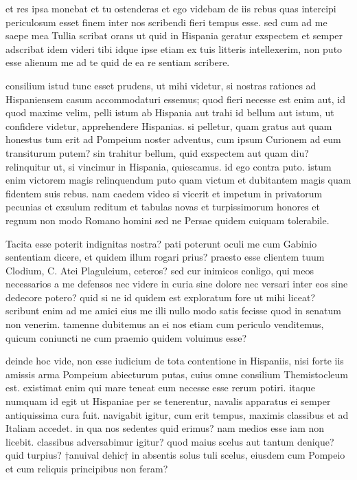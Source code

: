 


 et res ipsa monebat et tu ostenderas et ego videbam de iis rebus quas intercipi periculosum esset finem inter nos scribendi fieri tempus esse. sed cum ad me saepe mea Tullia scribat orans ut quid in Hispania geratur exspectem et semper adscribat idem videri tibi idque ipse etiam ex tuis litteris intellexerim, non puto esse alienum me ad te quid de ea re sentiam scribere.

 consilium istud tunc esset prudens, ut mihi videtur, si nostras rationes ad Hispaniensem casum accommodaturi essemus; quod fieri necesse est enim aut, id quod maxime velim, pelli istum ab Hispania aut trahi id bellum aut istum, ut confidere videtur, apprehendere Hispanias. si pelletur, quam gratus aut quam honestus tum erit ad Pompeium noster adventus, cum ipsum Curionem ad eum transiturum putem? sin trahitur bellum, quid exspectem aut quam diu? relinquitur ut, si vincimur in Hispania, quiescamus. id ego contra puto. istum enim victorem magis relinquendum puto quam victum et dubitantem magis quam fidentem suis rebus. nam caedem video si vicerit et impetum in privatorum pecunias et exsulum reditum et tabulas novas et turpissimorum honores et regnum non modo Romano homini sed ne Persae quidem cuiquam tolerabile.

 Tacita esse poterit indignitas nostra? pati poterunt oculi me cum Gabinio sententiam dicere, et quidem illum rogari prius? praesto esse clientem tuum Clodium, C. Atei Plaguleium, ceteros? sed cur inimicos conligo, qui meos necessarios a me defensos nec videre in curia sine dolore nec versari inter eos sine dedecore potero? quid si ne id quidem est exploratum fore ut mihi liceat? scribunt enim ad me amici eius me illi nullo modo satis fecisse quod in senatum non venerim. tamenne dubitemus an ei nos etiam cum periculo venditemus, quicum coniuncti ne cum praemio quidem voluimus esse?

 deinde hoc vide, non esse iudicium de tota contentione in Hispaniis, nisi forte iis amissis arma Pompeium abiecturum putas, cuius omne consilium Themistocleum est. existimat enim qui mare teneat eum necesse esse rerum potiri. itaque numquam id egit ut Hispaniae per se tenerentur, navalis apparatus ei semper antiquissima cura fuit. navigabit igitur, cum erit tempus, maximis classibus et ad Italiam accedet. in qua nos sedentes quid erimus? nam medios esse iam non licebit. classibus adversabimur igitur? quod maius scelus aut tantum denique? quid turpius? †anuival dehic† in absentis solus tuli scelus, eiusdem cum Pompeio et cum reliquis principibus non feram?

